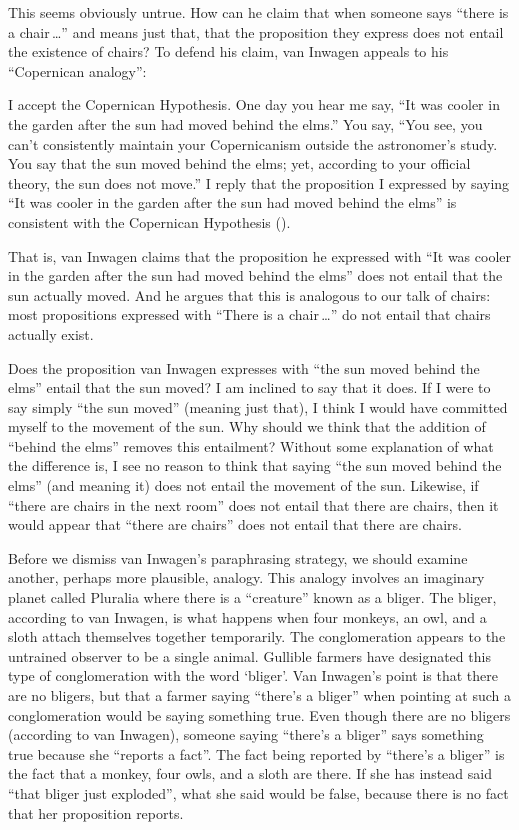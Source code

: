 \documentclass[11pt]{article}
\newenvironment{squote}{%
\begin{spacing}{1}
\begin{list}{}{%
    \setlength{\labelwidth}{0pt}%
    \rightmargin\leftmargin%
  }
\item\relax
}{%
\end{list}%
\end{spacing}
}
\begin{document}
\begin{spacing}{1.5}
This seems obviously untrue.  How can he claim that when someone says
``there is a chair\,\ldots '' and means just that, that the
proposition they express does not entail the existence of chairs?  To
defend his claim, van Inwagen appeals to his ``Copernican analogy'':

\begin{squote}
I accept the Copernican Hypothesis.  One day you hear me say, ``It was
cooler in the garden after the sun had moved behind the elms.''  You
say, ``You see, you can't consistently maintain your Copernicanism
outside the astronomer's study.  You say that the sun moved behind the
elms; yet, according to your official theory, the sun does not move.''
I reply that the proposition I expressed by saying ``It was cooler in
the garden after the sun had moved behind the elms'' is consistent
with the Copernican Hypothesis (\citeyear[101]{inwagen1995}).
\end{squote}
That is, van Inwagen claims that the proposition he expressed with
``It was cooler in the garden after the sun had moved behind the
elms'' does not entail that the sun actually moved.  And he argues
that this is analogous to our talk of chairs: most propositions
expressed with ``There is a chair\,\ldots '' do not entail that chairs
actually exist.

Does the proposition van Inwagen expresses with ``the sun moved behind
the elms'' entail that the sun moved? I am inclined to say that it
does.  If I were to say simply ``the sun moved'' (meaning just that),
I think I would have committed myself to the movement of the sun.  Why
should we think that the addition of ``behind the elms'' removes this
entailment?  Without some explanation of what the difference is, I see
no reason to think that saying ``the sun moved behind the elms'' (and
meaning it) does not entail the movement of the sun.  Likewise, if
``there are chairs in the next room'' does not entail that there are
chairs, then it would appear that ``there are chairs'' does not entail
that there are chairs.

Before we dismiss van Inwagen's paraphrasing strategy, we should
examine another, perhaps more plausible, analogy.  This analogy
involves an imaginary planet called Pluralia where there is a
``creature'' known as a bliger.  The bliger, according to van Inwagen,
is what happens when four monkeys, an owl, and a sloth attach
themselves together temporarily.  The conglomeration appears to the
untrained observer to be a single animal.  Gullible farmers have
designated this type of conglomeration with the word `bliger'.  Van
Inwagen's point is that there are no bligers, but that a farmer saying
``there's a bliger'' when pointing at such a conglomeration would be
saying something true.  Even though there are no bligers (according to
van Inwagen), someone saying ``there's a bliger'' says something true
because she ``reports a fact''.  The fact being reported by ``there's
a bliger'' is the fact that a monkey, four owls, and a sloth are
there.  If she has instead said ``that bliger just exploded'', what
she said would be false, because there is no fact that her proposition
reports.


\end{spacing}
\end{document}
